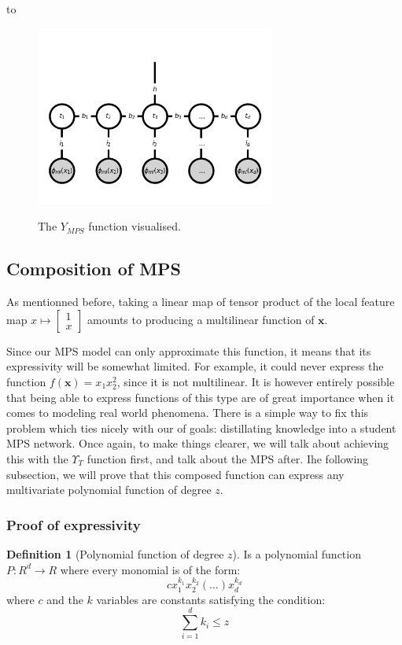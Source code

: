 \documentclass{article}
\theoremstyle{definition}
\newtheorem{definition}{Definition}[section]
\theoremstyle{definition}
\begin{document}
to 
\begin{figure}[hbt!]
    \centering
    \caption{The $Y_{MPS}$ function visualised.}
    \includegraphics[width=0.7\textwidth]{images/2023-03-21-10-22-39.png.png}
    \label{fig:mps_tensor_model}
\end{figure}

\subsection{Composition of MPS}
As mentionned before, taking a linear map of  tensor product of the local feature map 
$ x \mapsto \begin{bmatrix} 1 \\ x \end{bmatrix} $ amounts to producing a multilinear function of $\mathbf{x}$.

Since our MPS model can only approximate this function, it means that its expressivity
will be somewhat limited. For example, it could never express the function $f(\mathbf{x}) = x_1x_2^2$, since it is not multilinear. It is however entirely possible that being able to express functions of this type are of great importance when it comes to modeling real world phenomena. There is a simple way to fix this problem which ties nicely with our of goals: distillating knowledge into a student MPS network. Once again, to make things clearer, we will talk about achieving this with the $\Upsilon_{T}$ function first, and talk about the MPS after. Ihe following subsection, we will prove that this composed function can express
any multivariate polynomial function of degree $z$.

\subsubsection{Proof of expressivity}
\begin{definition}[Polynomial function of degree $z$]

    Is a polynomial function $P: R^d \to R$ where every monomial is of the form:
    \[
        cx_1^{k_1} x_2^{k_2}(\dots)x_d^{k_d}
    \]
    where $c$ and the $k$ variables are constants satisfying the condition:
    \[
        \sum_{i=1}^{d}k_i \leq z
    \]
\end{definition}
\end{document}
